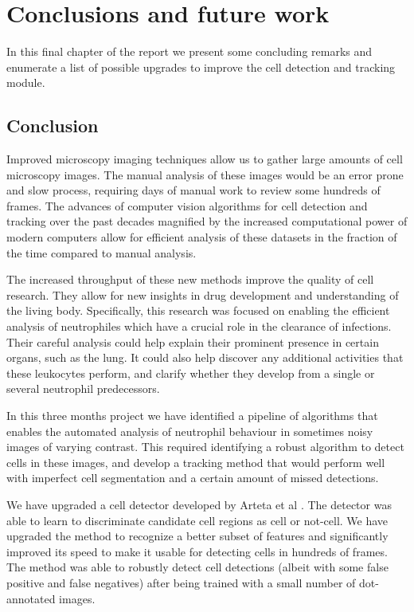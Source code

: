 		
\chapter{Conclusions and future work\statusfirstdraft}
\label{chap:conclusion}

In this final chapter of the report we present some concluding remarks and enumerate a list of possible upgrades to improve the cell detection and tracking module.

\section{Conclusion \statusfirstdraft}
\label{sec:conclusion_conclusion}

Improved microscopy imaging techniques allow us to gather large amounts of cell microscopy images. The manual analysis of these images would be an error prone and slow process, requiring days of manual work to review some hundreds of frames. The advances of computer vision algorithms for cell detection and tracking over the past decades magnified by the increased computational power of modern computers allow for efficient analysis of these datasets in the fraction of the time compared to manual analysis.

The increased throughput of these new methods improve the quality of cell research. They allow for new insights in drug development and understanding of the living body. Specifically, this research was focused on enabling the efficient analysis of neutrophiles which have a crucial role in the clearance of infections. Their careful analysis could help explain their prominent presence in certain organs, such as the lung. It could also help discover any additional activities that these leukocytes perform, and clarify whether they develop from a single or several neutrophil predecessors.

In this three months project we have identified a pipeline of algorithms that enables the automated analysis of neutrophil behaviour in sometimes noisy images of varying contrast. This required identifying a robust algorithm to detect cells in these images, and develop a tracking method that would perform well with imperfect cell segmentation and a certain amount of missed detections.

We have upgraded a cell detector developed by Arteta et al \cite{arteta12}. The detector was able to learn to discriminate candidate cell regions as cell or not-cell. We have upgraded the method to recognize a better subset of features and significantly improved its speed to make it usable for detecting cells in hundreds of frames. The method was able to robustly detect cell detections (albeit with some false positive and false negatives) after being trained with a small number of dot-annotated images.

